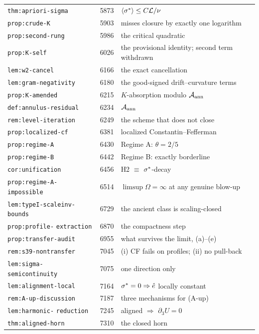 {\begin{longtable}{@{}>{\raggedright\arraybackslash}p{} l >{\raggedright\arraybackslash}p{}@{}}
\texttt{thm:apriori-sigma} & 5873 & \(\langle\sigma^{*}\rangle\le C\mathcal{L}/\nu\) \\
\texttt{prop:crude-K} & 5903 & misses closure by exactly one logarithm \\
\texttt{prop:second-rung} & 5986 & the critical quadratic \\
\texttt{prop:K-self} & 6026 & the provisional identity; second term withdrawn \\
\texttt{lem:w2-cancel} & 6166 & the exact cancellation \\
\texttt{lem:gram-negativity} & 6180 & the good-signed drift--curvature terms \\
\texttt{prop:K-amended} & 6215 & \(K\)-absorption modulo \(\mathcal{A}_{\mathrm{ann}}\) \\
\texttt{def:annulus-residual} & 6234 & \(\mathcal{A}_{\mathrm{ann}}\) \\
\texttt{rem:level-iteration} & 6249 & the scheme that does not close \\
\texttt{prop:localized-cf} & 6381 & localized Constantin--Fefferman \\
\texttt{prop:regime-A} & 6430 & Regime A: \(\theta=2/5\) \\
\texttt{prop:regime-B} & 6442 & Regime B: exactly borderline \\
\texttt{cor:unification} & 6456 & H2 \(\equiv\) \(\sigma^{*}\)-decay \\
\texttt{prop:regime-A-} \texttt{impossible} & 6514 & \(\limsup\Omega=\infty\)
  at any genuine blow-up \\
\texttt{lem:typeI-scaleinv-} \texttt{bounds} & 6729 & the ancient class is
  scaling-closed \\
\texttt{prop:profile-} \texttt{extraction} & 6870 & the compactness step \\
\texttt{prop:transfer-audit} & 6955 & what survives the limit, (a)--(e) \\
\texttt{rem:s39-nontransfer} & 7045 & (i) CF fails on profiles; (ii) no
  pull-back \\
\texttt{lem:sigma-} \texttt{semicontinuity} & 7075 & one direction only \\
\texttt{lem:alignment-local} & 7164 & \(\sigma^{*}=0\Rightarrow\hat{e}\) locally
  constant \\
\texttt{rem:A-up-discussion} & 7187 & three mechanisms for (A-up) \\
\texttt{lem:harmonic-} \texttt{reduction} & 7245 & aligned \(\Rightarrow\)
  \(\partial_3U=0\) \\
\texttt{thm:aligned-horn} & 7310 & the closed horn \\

\end{longtable}}
